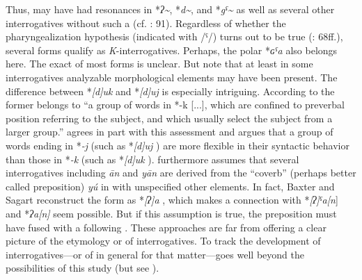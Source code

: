Thus,  may have had resonances in *\textit{ʔ{\textasciitilde}}, *\textit{d{\textasciitilde}}, and *\textit{gˤ{\textasciitilde}} as well as several other interrogatives without such a  (cf. \citealt{Pulleyblank1995}: 91). Regardless of whether the pharyngealization hypothesis (indicated with /ˤ/) turns out to be true (\citealt{BaxterSagart2014a}: 68ff.), several forms qualify as \textit{K}-interrogatives. Perhaps, the polar  *\textit{ɢˤa}  also belongs here. The exact  of most forms is unclear. But note that at least in some interrogatives analyzable morphological elements may have been present. The difference between *\textit{[d]uk}  and *\textit{[d]uj}  is especially intriguing. According to \citet[92]{Pulleyblank1995} the former belongs to “a group of words in *-k [...], which are confined to preverbal position referring to the subject, and which usually select the subject from a larger group.” \cite[236ff.]{Xu2006} agrees in part with this assessment and argues that a group of words ending in *\textit{-j} (such as *\textit{[d]uj} ) are more flexible in their syntactic behavior than those in *\textit{-k} (such as *\textit{[d]uk} ). \citet[91]{Pulleyblank1995} furthermore assumes that several interrogatives including \textit{ān}  and \textit{yān}  are derived from the “coverb” (perhaps better called preposition) \textit{yú}  in  with unspecified other elements. In fact, Baxter and Sagart reconstruct the form as *\textit{[ʔ}\textit{]a} , which makes a connection with *\textit{[ʔ}\textit{]ˤa}\textit{[n}]  and *\textit{ʔa[}\textit{n]}  seem possible. But if this assumption is true, the preposition must have fused with a following . These approaches are far from offering a clear picture of the etymology or  of  interrogatives. To track the development of interrogatives---or of  in general for that matter---goes well beyond the possibilities of this study (but see \citealt{Peyraube2005}).

